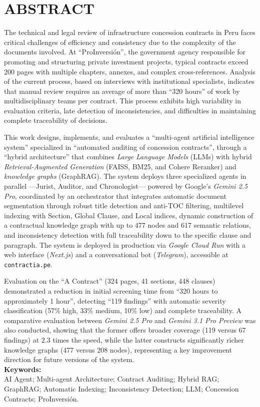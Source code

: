 \chapter*{\center \Large \vspace{-4.5cm} ABSTRACT}
\noindent

The technical and legal review of infrastructure concession contracts in Peru faces 
critical challenges of efficiency and consistency due to the complexity of the 
documents involved. At \enquote{ProInversión}, the government agency responsible for 
promoting and structuring private investment projects, typical contracts exceed 200 
pages with multiple chapters, annexes, and complex cross-references. Analysis of the 
current process, based on interviews with institutional specialists, indicates that 
manual review requires an average of more than \enquote{320 hours} of work by 
multidisciplinary teams per contract. This process exhibits high variability in 
evaluation criteria, late detection of inconsistencies, and difficulties in maintaining 
complete traceability of decisions.

This work designs, implements, and evaluates a \enquote{multi-agent artificial 
intelligence system} specialized in \enquote{automated auditing of concession 
contracts}, through a \enquote{hybrid architecture} that combines \textit{Large 
Language Models} (LLMs) with hybrid \textit{Retrieval-Augmented Generation} (FAISS, 
BM25, and Cohere Reranker) and \textit{knowledge graphs} (GraphRAG). The system 
deploys three specialized agents in parallel —Jurist, Auditor, and Chronologist— 
powered by Google's \textit{Gemini 2.5 Pro}, coordinated by an orchestrator that 
integrates automatic document segmentation through robust title detection and 
anti-TOC filtering, multilevel indexing with Section, Global Clause, and Local 
indices, dynamic construction of a contractual knowledge graph with up to 477 nodes 
and 617 semantic relations, and inconsistency detection with full traceability down 
to the specific clause and paragraph. The system is deployed in production via 
\textit{Google Cloud Run} with a web interface (\textit{Next.js}) and a conversational 
bot (\textit{Telegram}), accessible at \texttt{contractia.pe}.

Evaluation on the \enquote{A Contract} (324 pages, 41 
sections, 448 clauses) demonstrated a reduction in initial screening time from 
\enquote{320 hours to approximately 1 hour}, detecting \enquote{119 findings} with 
automatic severity classification (57\% high, 33\% medium, 10\% low) and complete 
traceability. A comparative evaluation between \textit{Gemini 2.5 Pro} and 
\textit{Gemini 3.1 Pro Preview} was also conducted, showing that the former offers 
broader coverage (119 versus 67 findings) at 2.3 times the speed, while the latter 
constructs significantly richer knowledge graphs (477 versus 208 nodes), representing 
a key improvement direction for future versions of the system. \\

\noindent \textbf{Keywords:}\\
\noindent AI Agent; Multi-agent Architecture; Contract Auditing; Hybrid RAG; 
GraphRAG; Automatic Indexing; Inconsistency Detection; LLM; Concession Contracts; 
ProInversión.
